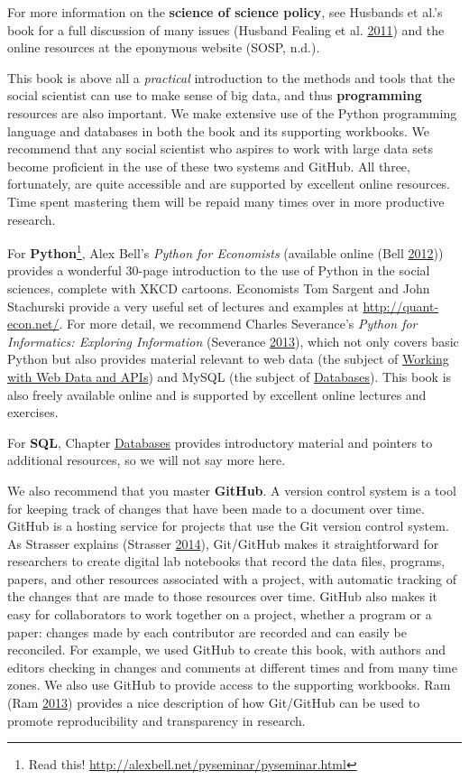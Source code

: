 \documentclass[]{krantz}
\begin{document}
For more information on the \textbf{science of science policy}, see
Husbands et al.'s book for a full discussion of many issues (Husband
Fealing et al. \protect\hyperlink{ref-husband2011science}{2011}) and the
online resources at the eponymous website (SOSP, n.d.).

This book is above all a \emph{practical} introduction to the methods
and tools that the social scientist can use to make sense of big data,
and thus \textbf{programming} resources are also important. We make
extensive use of the Python programming language and databases in both
the book and its supporting workbooks. We recommend that any social
scientist who aspires to work with large data sets become proficient in
the use of these two systems and GitHub. All three, fortunately, are
quite accessible and are supported by excellent online resources. Time
spent mastering them will be repaid many times over in more productive
research.

For \textbf{Python}\footnote{Read this!
  \url{http://alexbell.net/pyseminar/pyseminar.html}}, Alex Bell's
\emph{Python for Economists} (available online (Bell
\protect\hyperlink{ref-BellPython}{2012})) provides a wonderful 30-page
introduction to the use of Python in the social sciences, complete with
XKCD cartoons. Economists Tom Sargent and John Stachurski provide a very
useful set of lectures and examples at \url{http://quant-econ.net/}. For
more detail, we recommend Charles Severance's \emph{Python for
Informatics: Exploring Information} (Severance
\protect\hyperlink{ref-SeverancePython}{2013}), which not only covers
basic Python but also provides material relevant to web data (the
subject of \protect\hyperlink{chap:web}{Working with Web Data and APIs})
and MySQL (the subject of \protect\hyperlink{databases}{Databases}).
This book is also freely available online and is supported by excellent
online lectures and exercises.

For \textbf{SQL}, Chapter \protect\hyperlink{databases}{Databases}
provides introductory material and pointers to additional resources, so
we will not say more here.

We also recommend that you master \textbf{GitHub}. A version control
system is a tool for keeping track of changes that have been made to a
document over time. GitHub is a hosting service for projects that use
the Git version control system. As Strasser explains (Strasser
\protect\hyperlink{ref-GitResearch}{2014}), Git/GitHub makes it
straightforward for researchers to create digital lab notebooks that
record the data files, programs, papers, and other resources associated
with a project, with automatic tracking of the changes that are made to
those resources over time. GitHub also makes it easy for collaborators
to work together on a project, whether a program or a paper: changes
made by each contributor are recorded and can easily be reconciled. For
example, we used GitHub to create this book, with authors and editors
checking in changes and comments at different times and from many time
zones. We also use GitHub to provide access to the supporting workbooks.
Ram (Ram \protect\hyperlink{ref-ram2013git}{2013}) provides a nice
description of how Git/GitHub can be used to promote reproducibility and
transparency in research.
\end{document}
